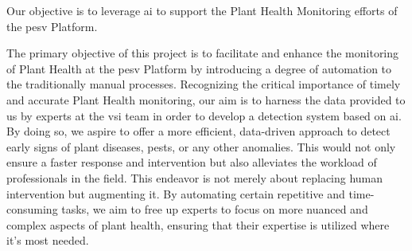 \label{01_thesis_objectives}


 Our objective is to leverage \gls{ai} to support the Plant Health Monitoring efforts of the \gls{pesv} Platform.


 The primary objective of this project is to facilitate and enhance the monitoring of Plant Health at the \gls{pesv} Platform by introducing a degree of automation to the traditionally manual processes. 
 Recognizing the critical importance of timely and accurate Plant Health monitoring, our aim is to harness the data provided to us by experts at the \gls{vsi} team in order to develop a detection system based on \gls{ai}. By doing so, we aspire to offer a more efficient, data-driven approach to detect early signs of plant diseases, pests, or any other anomalies. 
 This would not only ensure a faster response and intervention but also alleviates the workload of professionals in the field. This endeavor is not merely about replacing human intervention but augmenting it. By automating certain repetitive and time-consuming tasks, we aim to free up experts to focus on more nuanced and complex aspects of plant health, ensuring that their expertise is utilized where it's most needed.

  